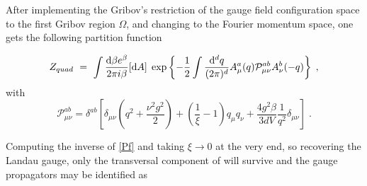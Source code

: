After implementing the Gribov's restriction of the gauge field configuration space
to the first Gribov region $\Omega$, and changing to the Fourier momentum space, one gets the following partition function

\begin{equation}
Z_{quad} ~=~ \int \frac{\mathrm{d}\beta  e^{\beta  }}{2\pi i\beta } [\mathrm{d} A] \; \exp \left\{  -\frac{1}{2} \int \frac{\mathrm{d}^{d}q}{(2\pi )^{d}}A_{\mu }^{a }(q)\mathcal{P}_{\mu \nu }^{ab }A_{\nu }^{b }(-q)   \right\}\;,  
\label{Zq1f}
\end{equation}
with
\begin{equation}
\mathcal{P}_{\mu \nu }^{ab } =\delta ^{ab }\left[  \delta _{\mu \nu }\left( q^{2}+\frac{\nu^{2}g^{2}}{2}\right) +\left( \frac{1}{\xi } -1  \right) q_{\mu }q_{\nu } +  \frac{4g^2\beta}{3dV} \frac{1}{q^2} \delta _{\mu \nu }  \right]   \;.  
\label{Pf}
\end{equation}

Computing the inverse of \eqref{Pf} and taking $\xi \to 0$ at the very end, so recovering the
Landau gauge, only the transversal component of will survive and the gauge propagators may be
identified as

